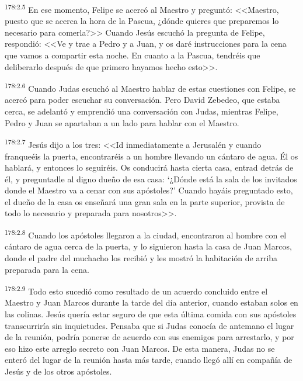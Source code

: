 \par 
\textsuperscript{178:2.5} En ese momento, Felipe se acercó al Maestro y preguntó: <<Maestro, puesto que se acerca la hora de la Pascua, ¿dónde quieres que preparemos lo necesario para comerla?>> Cuando Jesús escuchó la pregunta de Felipe, respondió: <<Ve y trae a Pedro y a Juan, y os daré instrucciones para la cena que vamos a compartir esta noche. En cuanto a la Pascua, tendréis que deliberarlo después de que primero hayamos hecho esto>>.

\par 
\textsuperscript{178:2.6} Cuando Judas escuchó al Maestro hablar de estas cuestiones con Felipe, se acercó para poder escuchar su conversación. Pero David Zebedeo, que estaba cerca, se adelantó y emprendió una conversación con Judas, mientras Felipe, Pedro y Juan se apartaban a un lado para hablar con el Maestro.

\par 
\textsuperscript{178:2.7} Jesús dijo a los tres: <<Id inmediatamente a Jerusalén y cuando franqueéis la puerta, encontraréis a un hombre llevando un cántaro de agua. Él os hablará, y entonces lo seguiréis. Os conducirá hasta cierta casa, entrad detrás de él, y preguntadle al digno dueño de esa casa: `¿Dónde está la sala de los invitados donde el Maestro va a cenar con sus apóstoles?' Cuando hayáis preguntado esto, el dueño de la casa os enseñará una gran sala en la parte superior, provista de todo lo necesario y preparada para nosotros>>.

\par 
\textsuperscript{178:2.8} Cuando los apóstoles llegaron a la ciudad, encontraron al hombre con el cántaro de agua cerca de la puerta, y lo siguieron hasta la casa de Juan Marcos, donde el padre del muchacho los recibió y les mostró la habitación de arriba preparada para la cena.

\par 
\textsuperscript{178:2.9} Todo esto sucedió como resultado de un acuerdo concluido entre el Maestro y Juan Marcos durante la tarde del día anterior, cuando estaban solos en las colinas. Jesús quería estar seguro de que esta última comida con sus apóstoles transcurriría sin inquietudes. Pensaba que si Judas conocía de antemano el lugar de la reunión, podría ponerse de acuerdo con sus enemigos para arrestarlo, y por eso hizo este arreglo secreto con Juan Marcos. De esta manera, Judas no se enteró del lugar de la reunión hasta más tarde, cuando llegó allí en compañía de Jesús y de los otros apóstoles.

